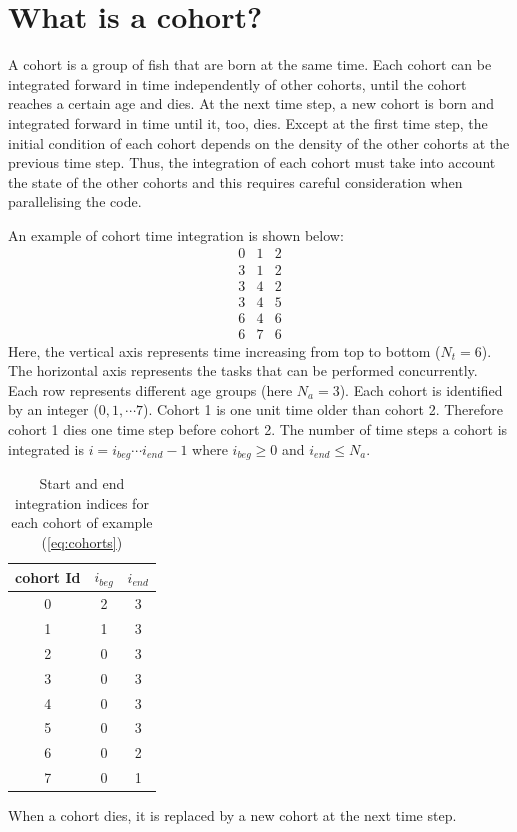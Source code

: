 \documentclass[a4paper,oneside,12pt]{article}
\begin{document}
\section{What is a cohort?}

A cohort is a group of fish that are born at the same time. Each cohort 
can be integrated forward in time independently of other cohorts, until the cohort reaches a certain age and dies. 
At the next time step, a new cohort is born and integrated forward in time until it, too, dies. Except 
at the first time step, the initial condition of each cohort depends on 
the density of the other cohorts at the previous time step. Thus, the integration of 
each cohort must take into account the state of the other cohorts and this requires 
careful consideration when parallelising the code.

An example of cohort time integration is shown below:
\begin{equation} \label{eq:cohorts}
\begin{array}{ccc}
0 & 1 & 2 \\
3 & 1 & 2 \\
3 & 4 & 2 \\
3 & 4 & 5 \\
6 & 4 & 6 \\
6 & 7 & 6
\end{array}
\end{equation}
Here, the vertical axis represents time increasing from top to bottom ($N_t = 6$). The horizontal axis represents the 
tasks that can be performed concurrently. Each row represents different age groups (here $N_a = 3$). 
Each cohort is identified by an integer ($0, 1, \cdots 7$). 
Cohort 1 is one unit time older than cohort 2. Therefore cohort 1 dies one time step before cohort 2. 
The number of time steps 
a cohort is integrated is $i = i_{beg} \cdots i_{end} - 1$ where $i_{beg} \geq 0$  and $i_{end} \leq N_a$.
\begin{table}[htbp]
    \centering %
    \caption{Start and end integration indices for each cohort of example (\ref{eq:cohorts})}
    \label{tab:cohort_indices}
    \begin{tabular}{c|cc} %
        \toprule %
        cohort Id & $i_{beg}$ & $i_{end}$ \\
        \midrule %
        0 & 2 & 3 \\
        1 & 1 & 3 \\
        2 & 0 & 3 \\
        3 & 0 & 3 \\
        4 & 0 & 3 \\
        5 & 0 & 3 \\
        6 & 0 & 2 \\
        7 & 0 & 1 \\
        \bottomrule %
    \end{tabular}
\end{table}
When a cohort dies, it is replaced by a new cohort at the next time step. 
\end{document}
